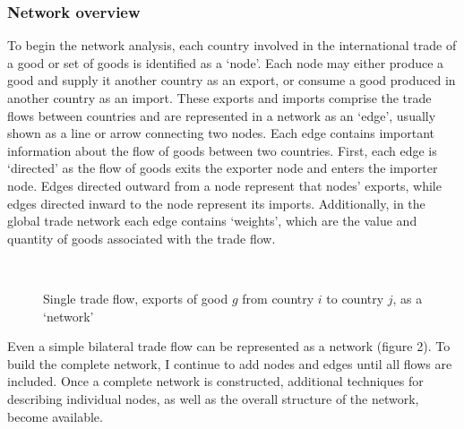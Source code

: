 \documentclass[10pt,letterpaper,pdftex]{article}
\begin{document}
\subsubsection{Network overview} \label{nw2}
To begin the network analysis, each country involved in the international trade of a good or set of goods is identified as a `node'. Each node may either produce a good and supply it another country as an export, or consume a good produced in another country as an import. These exports and imports comprise the trade flows between countries and are represented in a network as an `edge', usually shown as a line or arrow connecting two nodes. Each edge contains important information about the flow of goods between two countries. First, each edge is `directed' as the flow of goods exits the exporter node and enters the importer node. Edges directed outward from a node represent that nodes' exports, while edges directed inward to the node represent its imports. Additionally, in the global trade network each edge contains `weights', which are the value and quantity of goods associated with the trade flow.

\begin{figure}[!htb]\label{fig:nw_simple}
  \caption{Single trade flow, exports of good $g$ from country $i$ to country $j$, as a `network'}
  {\centering
{}\\}
\end{figure}

Even a simple bilateral trade flow can be represented as a network (figure 2). To build the complete network, I continue to add nodes and edges until all flows are included. Once a complete network is constructed, additional techniques for describing individual nodes, as well as the overall structure of the network, become available.
\end{document}
